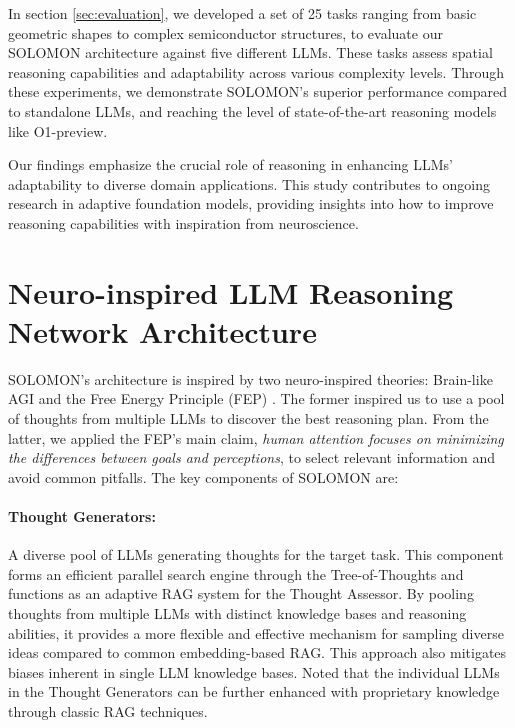 \documentclass{article}
\begin{document}
In section \ref{sec:evaluation}, we developed a set of 25 tasks ranging from basic geometric shapes to complex semiconductor structures, to evaluate our SOLOMON architecture against five different LLMs. These tasks assess spatial reasoning capabilities and adaptability across various complexity levels. Through these experiments, we demonstrate SOLOMON's superior performance compared to standalone LLMs, and reaching the level of state-of-the-art reasoning models like O1-preview. 

Our findings emphasize the crucial role of reasoning in enhancing LLMs' adaptability to diverse domain applications. This study contributes to ongoing research in adaptive foundation models, providing insights into how to improve reasoning capabilities with inspiration from neuroscience.

\section{Neuro-inspired LLM Reasoning Network Architecture}
\label{sec:architecture}
SOLOMON's architecture is inspired by two neuro-inspired theories: Brain-like AGI \cite{Byrnes2022} and the Free Energy Principle (FEP) \cite{Parr2022}. The former inspired us to use a pool of thoughts from multiple LLMs to discover the best reasoning plan. From the latter, we applied the FEP's main claim, \textit{human attention focuses on minimizing the differences between goals and perceptions}, to select relevant information and avoid common pitfalls. The key components of SOLOMON are:

\paragraph{Thought Generators:} A diverse pool of LLMs generating thoughts for the target task. This component forms an efficient parallel search engine through the Tree-of-Thoughts \cite{yao2023treethoughtsdeliberateproblem, zhang2024cumulativereasoninglargelanguage, Besta_2024, besta2024demystifyingchainstreesgraphs} and functions as an adaptive RAG system for the Thought Assessor. By pooling thoughts from multiple LLMs with distinct knowledge bases and reasoning abilities, it provides a more flexible and effective mechanism for sampling diverse ideas compared to common embedding-based RAG. This approach also mitigates biases inherent in single LLM knowledge bases. Noted that the individual LLMs in the Thought Generators can be further enhanced with proprietary knowledge through classic RAG techniques.
\end{document}
